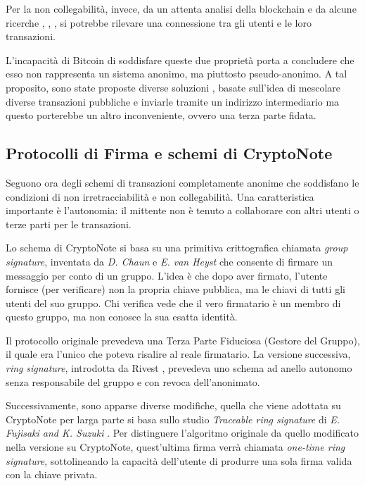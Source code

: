 Per la non collegabilità, invece, da un attenta analisi della blockchain e da alcune ricerche
\cite{reid2013analysis}, \cite{analysis_bitcoin}, \cite{ron2013quantitative}, si potrebbe rilevare una
connessione tra gli utenti e le loro transazioni.

L'incapacità di Bitcoin di soddisfare queste due proprietà porta a
concludere che esso non rappresenta un sistema anonimo, ma piuttosto
pseudo-anonimo. 
A tal proposito, sono state proposte diverse soluzioni \cite{mixing_services},
\cite{secure_multiparty} basate sull'idea di mescolare diverse transazioni pubbliche
e inviarle tramite un indirizzo intermediario ma questo porterebbe un
altro inconveniente, ovvero una terza parte fidata.


\subsection{Protocolli di Firma e schemi di CryptoNote}\label{protocolli-di-firma-e-schemi-di-cryptonote}
Seguono ora degli schemi di transazioni completamente anonime che
soddisfano le condizioni di non irretracciabilità e non collegabilità.
Una caratteristica importante è l'autonomia: il mittente non è tenuto a
collaborare con altri utenti o terze parti per le transazioni.

Lo schema di CryptoNote si basa su una primitiva crittografica chiamata
\emph{group signature}, inventata da \emph{D. Chaun} e \emph{E. van
Heyst} \cite{chaum_van_heyst} che consente di firmare un messaggio per conto di un
gruppo.
L'idea è che dopo aver firmato, l'utente fornisce (per verificare) non la propria
chiave pubblica, ma le chiavi di tutti gli utenti del suo gruppo. Chi
verifica vede che il vero firmatario è un membro di questo gruppo, ma
non conosce la sua esatta identità.

Il protocollo originale prevedeva una Terza Parte Fiduciosa (Gestore del
Gruppo), il quale era l'unico che poteva risalire al reale firmatario. La
versione successiva, \emph{ring} \emph{signature}, introdotta da Rivest
\cite{rivest_et_al} , prevedeva uno schema ad anello autonomo senza
responsabile del gruppo e con revoca dell'anonimato.

Successivamente, sono apparse diverse modifiche, quella che viene
adottata su CryptoNote per larga parte si basa sullo studio
\emph{Traceable ring signature} di \emph{E. Fujisaki and K. Suzuki}
\cite{fujisaki_suzuki}.
Per distinguere l'algoritmo originale da quello
modificato nella versione su CryptoNote, quest'ultima
firma verrà chiamata \emph{one-time ring signature}, sottolineando la
capacità dell'utente di produrre una sola firma valida
con la chiave privata.

